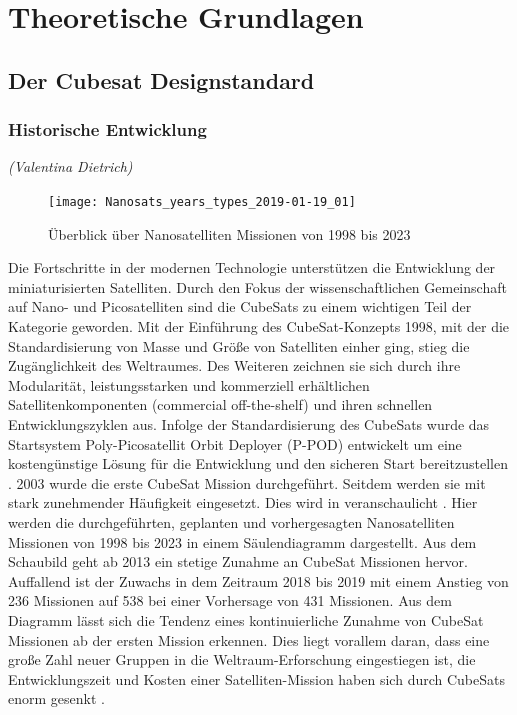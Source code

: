 \chapter{Theoretische Grundlagen}\label{theorie}
\section{Der Cubesat Designstandard}%
	\subsection{Historische Entwicklung}
	\hfill\emph{(Valentina Dietrich)}
				\begin{figure}[h]
				\centering
					\texttt{[image: Nanosats\_years\_types\_2019-01-19\_01]}
				\caption{Überblick über Nanosatelliten Missionen von 1998 bis 2023 \cite{ErikKulu.2019}}
				\label{fig:NanosatsTypes}
			\end{figure}
	Die Fortschritte in der modernen Technologie unterstützen die Entwicklung der miniaturisierten Satelliten. Durch den Fokus der wissenschaftlichen Gemeinschaft auf Nano- und Picosatelliten sind die CubeSats zu einem wichtigen Teil der Kategorie geworden. Mit der Einführung des CubeSat-Konzepts 1998, mit der die Standardisierung von Masse und Größe von Satelliten einher ging, stieg die Zugänglichkeit des Weltraumes. Des Weiteren zeichnen sie sich durch ihre Modularität, leistungsstarken und kommerziell erhältlichen Satellitenkomponenten (commercial off-the-shelf) und ihren schnellen Entwicklungszyklen aus. Infolge der Standardisierung des CubeSats wurde das Startsystem Poly-Picosatellit Orbit Deployer (P-POD) entwickelt um eine kostengünstige Lösung für die Entwicklung und den sicheren Start bereitzustellen \cite[S. 1 - 4]{RahmatSamii.2017}. 2003 wurde die erste CubeSat Mission durchgeführt. Seitdem werden sie mit stark zunehmender Häufigkeit eingesetzt. Dies wird in  veranschaulicht \cite[S. 1]{firstone}.  Hier werden die durchgeführten, geplanten und vorhergesagten Nanosatelliten Missionen von 1998 bis 2023 in einem Säulendiagramm dargestellt. Aus dem Schaubild geht ab 2013 ein stetige Zunahme an CubeSat Missionen hervor. Auffallend ist der Zuwachs in dem Zeitraum 2018 bis 2019 mit einem Anstieg von  236 Missionen auf 538 bei einer Vorhersage von 431 Missionen. Aus dem Diagramm lässt sich die Tendenz eines kontinuierliche Zunahme von CubeSat Missionen ab der ersten Mission erkennen. Dies liegt vorallem daran, dass eine große Zahl neuer Gruppen in die Weltraum-Erforschung eingestiegen ist, die Entwicklungszeit und Kosten einer Satelliten-Mission haben sich durch CubeSats enorm gesenkt \cite[S. 1 - 4]{RahmatSamii.2017}.
	
